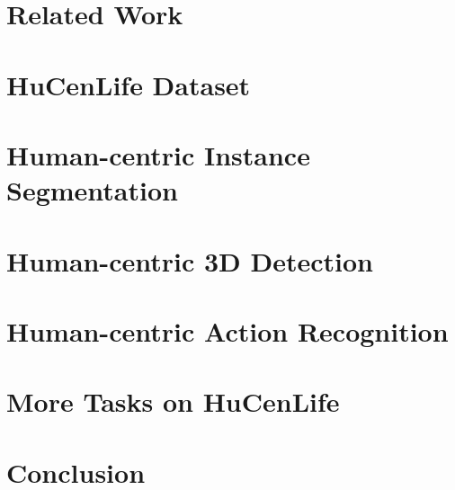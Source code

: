 \documentclass[10pt,twocolumn,letterpaper]{article}
\begin{document}
\section{Related Work}
\label{sec:related}


\section{HuCenLife Dataset}
\label{sec:dataset}

\section{Human-centric Instance Segmentation}
\label{sec:insseg}

\section{Human-centric 3D Detection}
\label{sec:detect}


\section{Human-centric Action Recognition}
\label{sec:action}


\section{More Tasks on HuCenLife}
\label{sec:moretask}


\section{Conclusion}
\label{sec:conclusion}

{\small


}

\appendix
\label{sec:appendix}
\clearpage

\end{document}
